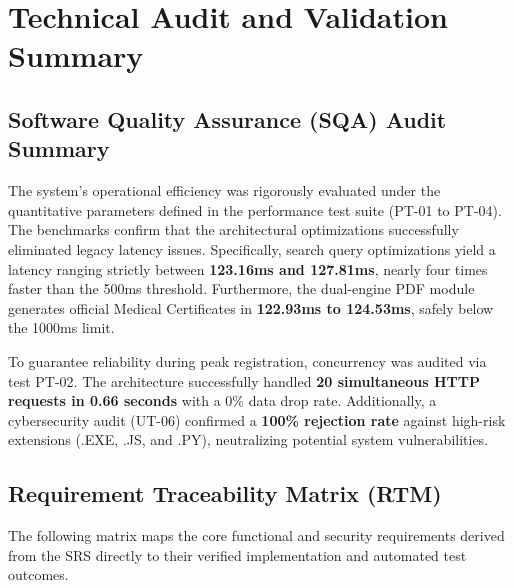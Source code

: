 
\chapter{Technical Audit and Validation Summary}
\label{appendix:technical_audit}

\section{Software Quality Assurance (SQA) Audit Summary}
The system’s operational efficiency was rigorously evaluated under the quantitative parameters defined in the performance test suite (PT-01 to PT-04). The benchmarks confirm that the architectural optimizations successfully eliminated legacy latency issues. Specifically, search query optimizations yield a latency ranging strictly between \textbf{123.16ms and 127.81ms}, nearly four times faster than the 500ms threshold. Furthermore, the dual-engine PDF module generates official Medical Certificates in \textbf{122.93ms to 124.53ms}, safely below the 1000ms limit.

To guarantee reliability during peak registration, concurrency was audited via test PT-02. The architecture successfully handled \textbf{20 simultaneous HTTP requests in 0.66 seconds} with a 0\% data drop rate. Additionally, a cybersecurity audit (UT-06) confirmed a \textbf{100\% rejection rate} against high-risk extensions (.EXE, .JS, and .PY), neutralizing potential system vulnerabilities.

\section{Requirement Traceability Matrix (RTM)}
The following matrix maps the core functional and security requirements derived from the SRS directly to their verified implementation and automated test outcomes.

